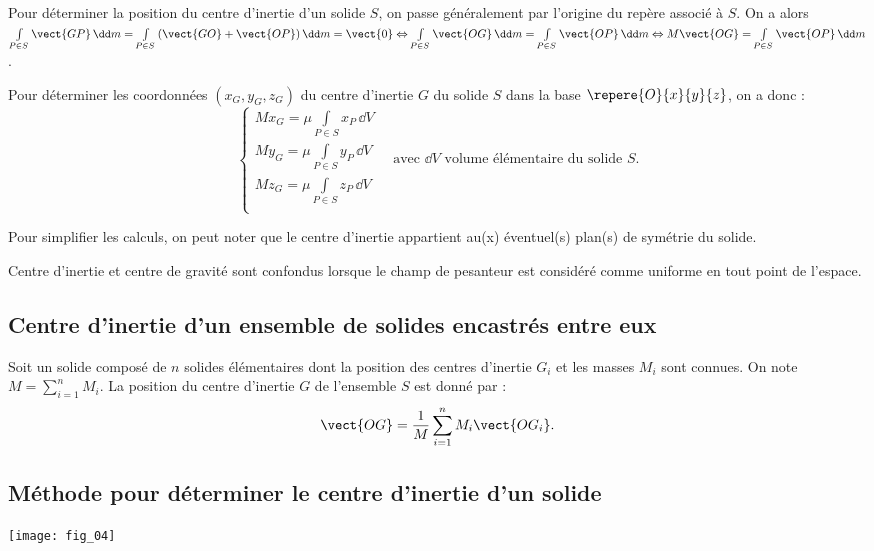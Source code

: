 Pour déterminer la position du centre d'inertie d'un solide $S$, on passe généralement par l'origine du repère associé à $S$. On a alors 
$\int\limits_{P\in S} \vect{GP} \, \dd m=\int\limits_{P\in S} \left(\vect{GO}+\vect{OP}\right) \dd m = \vect{0} 
\Leftrightarrow \int\limits_{P\in S} \vect{OG} \,\dd m =\int\limits_{P\in S} \vect{OP} \,\dd m
\Leftrightarrow  M\vect{OG} =\int\limits_{P\in S} \vect{OP} \,\dd m$.

\begin{methode}
Pour déterminer les coordonnées $\left(x_G,y_G,z_G\right)$ du centre d'inertie $G$ du solide $S$ dans la base $\repere{O}{x}{y}{z}$, on a donc :
$$
\left\{
\begin{array}{l}
M x_G =\mu \int\limits_{P\in S} x_P \,\dd V \\
M y_G =\mu \int\limits_{P\in S} y_P \,\dd V \\
M z_G =\mu \int\limits_{P\in S} z_P \,\dd V \\
\end{array}
\right. \quad \text{avec }\dd V \text{ volume élémentaire du solide $S$.}
$$ 

Pour simplifier les calculs, on peut noter que le centre d'inertie appartient au(x) éventuel(s) plan(s) de symétrie du solide.
\end{methode}

\begin{remarque}
Centre d'inertie et centre de gravité sont confondus lorsque le champ de pesanteur est considéré comme uniforme en tout point de l'espace. 
\end{remarque}

\subsection{Centre d'inertie d'un ensemble de solides encastrés entre eux}
\begin{methode} 
Soit un solide composé de $n$ solides élémentaires dont la position des centres d'inertie $G_i$ et les masses $M_i$ sont connues. On note $M=\sum\limits_{i=1}^{n}M_i$.  La position du centre d'inertie $G$ de l'ensemble $S$ est donné par :
$$\vect{OG}=\dfrac{1}{M}\sum\limits_{i=1}^{n}M_i \vect{OG_i} .$$

\end{methode}


\subsection{Méthode pour déterminer le centre d'inertie d'un solide \cite{2}}
\begin{center}
\texttt{[image: fig\_04]}
\end{center}

